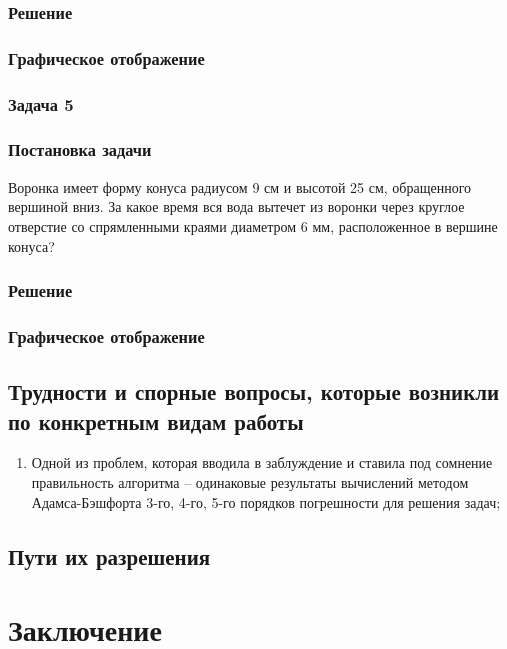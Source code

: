 \documentclass[a4paper,fleqn,14pt,titlepage]{extarticle}
\begin{document}
			\subsubsection*{Решение}
			\subsubsection*{Графическое отображение}
		\subsubsection{Задача 5}
			\subsubsection*{Постановка задачи}
				Воронка имеет форму конуса радиусом 9 см и высотой 25 см, обращенного вершиной вниз. За какое время вся вода вытечет из воронки через круглое отверстие со спрямленными краями диаметром 6 мм, расположенное в вершине конуса?
			\subsubsection*{Решение}
			\subsubsection*{Графическое отображение}
	\subsection{Трудности и спорные вопросы, которые возникли по конкретным 
		видам работы}
		\begin{enumerate}
			\item Одной из проблем, которая вводила в заблуждение и ставила
			под сомнение правильность алгоритма – одинаковые результаты вычислений методом Адамса-Бэшфорта 3-го, 4-го, 5-го порядков погрешности для решения задач;
		\end{enumerate}
	\subsection{Пути их разрешения}
	\section{Заключение}
\end{document}
